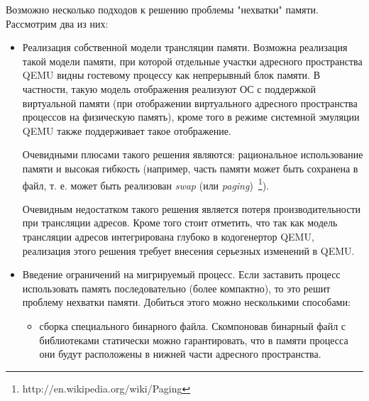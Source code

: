 Возможно несколько подходов к решению проблемы "нехватки" памяти. Рассмотрим два из них:

\begin{itemize}

    \item Реализация собственной модели трансляции памяти. Возможна реализация такой модели памяти, при которой отдельные участки адресного пространства QEMU видны гостевому процессу как непрерывный блок памяти. В частности, такую модель отображения реализуют ОС с поддержкой виртуальной памяти (при отображении виртуального адресного пространства процессов на физическую память), кроме того в режиме системной эмуляции QEMU также поддерживает такое отображение.

    Очевидными плюсами такого решения являются: рациональное использование памяти и высокая гибкость (например, часть памяти может быть сохранена в файл, т. е. может быть реализован \textit{swap} (или \textit{paging})~\footnote{http://en.wikipedia.org/wiki/Paging}).

    Очевидным недостатком такого решения является потеря производительности при трансляции адресов. Кроме того стоит отметить, что так как модель трансляции адресов интегрирована глубоко в кодогенертор QEMU, реализация этого решения требует внесения серьезных изменений в QEMU.

    \item Введение ограничений на мигрируемый процесс. Если заставить процесс использовать память последовательно (более компактно), то это решит проблему нехватки памяти. Добиться этого можно несколькими способами:

    \begin{itemize}

\begin{lstlisting}[caption=Резервирования места под стек в GCC Asm, label=code:reserve_stack]
    .data
        stack_end:
            .space  8192
        .set  stack_begin, .

    ...

    .text
        .globl  main
        .type  main,  @function

        main:

            # use custom stack segment
            leal   stack_begin, %esp
            movl   %esp,        %ebp

    ...
\end{lstlisting}



        \item сборка специального бинарного файла. Скомпоновав бинарный файл с библиотеками статически можно гарантировать, что в памяти процесса они будут расположены в нижней части адресного пространства.


\end{itemize}
\end{itemize}

